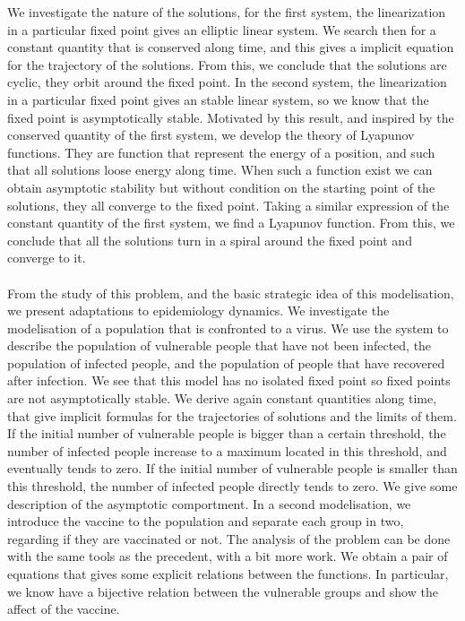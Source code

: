 We investigate the nature of the solutions, for the first system, the linearization in a particular fixed point gives an elliptic linear system. We search then for a constant quantity that is conserved along time, and this gives a implicit equation for the trajectory of the solutions. From this, we conclude that the solutions are cyclic, they orbit around the fixed point. In the second system, the linearization in a particular fixed point gives an stable linear system, so we know that the fixed point is asymptotically stable. Motivated by this result, and inspired by the conserved quantity of the first system, we develop the theory of Lyapunov functions. They are function that represent the energy of a position, and such that all solutions loose energy along time. When such a function exist we can obtain asymptotic stability but without condition on the starting point of the solutions, they all converge to the fixed point. Taking a similar expression of the constant quantity of the first system, we find a Lyapunov function. From this, we conclude that all the solutions turn in a spiral around the fixed point and converge to it.
\\ \\
From the study of this problem, and the basic strategic idea of this modelisation, we present adaptations to epidemiology dynamics. We investigate the modelisation of a population that is confronted to a virus. We use the \LV system to describe the population of vulnerable people that have not been infected, the population of infected people, and the population of people that have recovered after infection. We see that this model has no isolated fixed point so fixed points are not asymptotically stable. We derive again constant quantities along time, that give implicit formulas for the trajectories of solutions and the limits of them. If the initial number of vulnerable people is bigger than a certain threshold, the number of infected people increase to a maximum located in this threshold, and eventually tends to zero. If the initial number of vulnerable people is smaller than this threshold, the number of infected people directly tends to zero. We give some description of the asymptotic comportment.
In a second modelisation, we introduce the vaccine to the population and separate each group in two, regarding if they are vaccinated or not. The analysis of the problem can be done with the same tools as the precedent, with a bit more work. We obtain a pair of equations that gives some explicit relations between the functions. In particular, we know have a bijective relation between the vulnerable groups and show the affect of the vaccine.